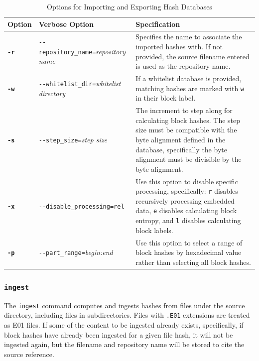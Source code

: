 \documentclass[11pt,fleqn]{article} %
\begin{document}
\begin{table}[!ht]
\centering
\caption{Options for Importing and Exporting Hash Databases}
\label{tab:ImportExportOptions}
\begin{tabular}{|p{1.5 cm}|p{8 cm}|p{4 cm}|}
\hline \hline
\textbf{Option} & \textbf{Verbose Option} & \textbf{Specification} \\
\hline
\textbf{\texttt{-r}} & \verb+--repository_name=+\textit{repository name} & Specifies the name to associate the imported hashes with. If not provided, the source filename entered is used as the repository name.\\
\hline
\textbf{\texttt{-w}} & \verb+--whitelist_dir=+\textit{whitelist directory} & If a whitelist database is provided, matching hashes are marked with \verb+w+ in their block label.\\
\hline
\textbf{\texttt{-s}} & \verb+--step_size=+\textit{step size} & The increment to step along for calculating block hashes. The step size must be compatible with the byte alignment defined in the database, specifically the byte alignment must be divisible by the byte alignment.\\
\hline
\textbf{\texttt{-x}} & \verb+--disable_processing=rel+ & Use this option to disable specific processing, specifically: \verb+r+ disables recursively processing embedded data, \verb+e+ disables calculating block entropy, and \verb+l+ disables calculating block labels.\\
\hline
\textbf{\texttt{-p}} & \verb+--part_range=+\textit{begin:end} & Use this option to select a range of block hashes by hexadecimal value rather than selecting all block hashes.\\
\hline
\end{tabular}
\end{table}

\subsubsection{\texttt{ingest}}
The \verb+ingest+ command computes and ingests hashes from files under the source directory, including files in subdirectories. Files with \verb+.E01+ extensions are treated as E01 files. If some of the content to be ingested already exists, specifically, if block hashes have already been ingested for a given file hash, it will not be ingested again, but the filename and repository name will be stored to cite the source reference.\\
\end{document}
